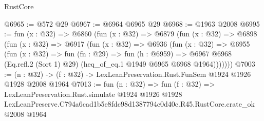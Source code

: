 \begin{lexlean}{RustCore}
\begin{coremodule}
@6965 := @572 @29
@6967 := @6964 @6965 @29
@6968 := @1963 @2008
@6995 := fun (x : @32) =>
  @6860
    (fun (x : @32) =>
    @6879
      (fun (x : @32) =>
      @6898
        (fun (x : @32) =>
        @6917
          (fun (x : @32) =>
          @6936
            (fun (x : @32) =>
            @6955
              (fun (x : @32) =>
              fun (fn : @29) =>
              fun (h : @6959) =>
              @6967 @6968 (Eq.refl.{2} (Sort 1) @29) (heq_of_eq.{1} @1949 @6965 @6968 @1964)))))))
@7003 := (n : @32) -> (f : @32) -> LexLeanPreservation.Rust.FunSem @1924 @1926 @1928 @2008 @1964
@7013 := fun (n : @32) =>
  fun (f : @32) =>
  LexLeanPreservation.Rust.simulate
    @1924
    @1926
    @1928
    LexLeanPreserve.C794a6cad1b5e8fdc98d1387794c0d40c.R45.RustCore.crate_ok
    @2008
    @1964
\end{coremodule}
\end{lexlean}

